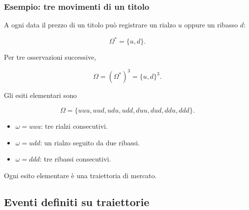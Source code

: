 \documentclass[handout]{beamer}%
\newenvironment{stepitemize}{\begin{itemize}[<+->]}{\end{itemize} }
\providecommand{\1}{\mathbf{1}}
\providecommand{\QTR}[2]{\csname #1\endcsname{#2}}
\begin{document}
\begin{frame}%
%

\frametitle{Esempio: tre movimenti di un titolo}%


A ogni data il prezzo di un titolo pu\`{o} registrare un rialzo $u$ oppure un
ribasso $d$:%

\[
\Omega^{\ast}=\{u,d\}.
\]


Per tre osservazioni successive,%

\[
\Omega=(\Omega^{\ast})^{3}=\{u,d\}^{3}.
\]


Gli esiti elementari sono%

\[
\Omega=\{uuu,uud,udu,udd,duu,dud,ddu,ddd\}.
\]


\medskip

\begin{stepitemize}
\item $\omega=uuu$: tre rialzi consecutivi.

\item $\omega=udd$: un rialzo seguito da due ribassi.

\item $\omega=ddd$: tre ribassi consecutivi.
\end{stepitemize}

\medskip

\begin{center}
{\small Ogni esito elementare \`{e} una traiettoria di mercato.}
\end{center}%

\transboxout
\end{frame}%




\subsection{Eventi definiti su traiettorie}%
\end{document}
